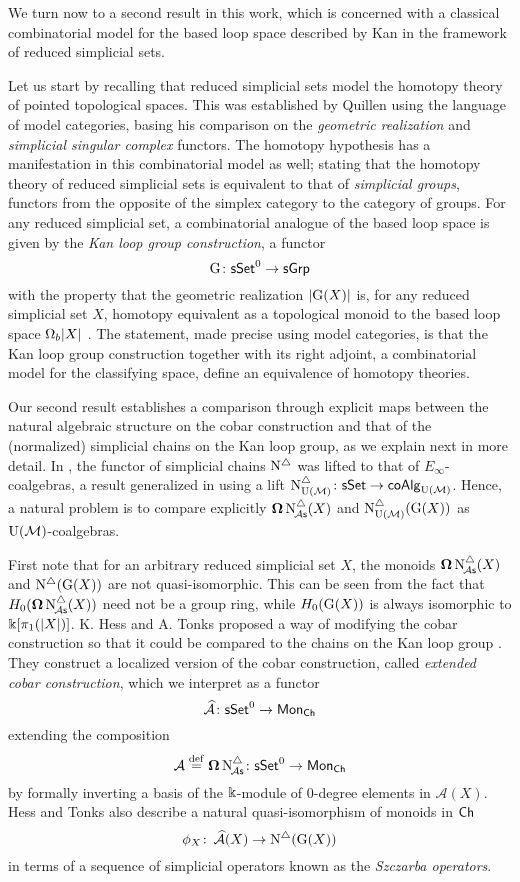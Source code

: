 We turn now to a second result in this work, which is concerned with a classical combinatorial model for the based loop space described by Kan in the framework of reduced simplicial sets.

Let us start by recalling that reduced simplicial sets model the homotopy theory of pointed topological spaces.
This was established by Quillen using the language of model categories, basing his comparison on the \textit{geometric realization} and \textit{simplicial singular complex} functors.
The homotopy hypothesis has a manifestation in this combinatorial model as well; stating that the homotopy theory of reduced simplicial sets is equivalent to that of \textit{simplicial groups}, functors from the opposite of the simplex category to the category of groups.
For any reduced simplicial set, a combinatorial analogue of the based loop space is given by the \textit{Kan loop group construction}, a functor
\[
\operatorname{G} \colon \mathsf{sSet}^0 \to \mathsf{sGrp}
\]
with the property that the geometric realization $\lvert\operatorname{G}(X)\rvert$ is, for any reduced simplicial set $X$, homotopy equivalent as a topological monoid to the based loop space $\Omega_b \lvert X\rvert$ \cite{berger1995loops}.
The statement, made precise using model categories, is that the Kan loop group construction together with its right adjoint, a combinatorial model for the classifying space, define an equivalence of homotopy theories.

Our second result establishes a comparison through explicit maps between the natural algebraic structure on the cobar construction and that of the (normalized) simplicial chains on the Kan loop group, as we explain next in more detail. In \cite{mcclure2003multivariable, berger2004combinatorial}, the functor of simplicial chains $\operatorname{N^{\triangle}}$ was lifted to that of $E_{\infty}$-coalgebras, a result generalized in \cite{medina2020prop1} using a lift $\operatorname{N^{\triangle}_{{\operatorname{U}(\mathcal{M})}}} \colon \mathsf{sSet} \to \mathsf{coAlg}_{{\operatorname{U}(\mathcal{M})}}$.
Hence, a natural problem is to compare explicitly $\operatorname{\mathbf{\Omega}} \operatorname{N^{\triangle}_{\!{\mathcal{A}\mathsf{s}}}}(X)$ and $\operatorname{N^{\triangle}_{{\operatorname{U}(\mathcal{M})}}}(\operatorname{G}(X))$ as ${\operatorname{U}(\mathcal{M})}$-coalgebras.

First note that for an arbitrary reduced simplicial set $X$, the monoids $\operatorname{\mathbf{\Omega}} \operatorname{N^{\triangle}_{\!{\mathcal{A}\mathsf{s}}}}(X)$ and $\operatorname{N^{\triangle}}(\operatorname{G}(X))$ are not quasi-isomorphic.
This can be seen from the fact that $H_0(\operatorname{\mathbf{\Omega}} \operatorname{N^{\triangle}_{\!{\mathcal{A}\mathsf{s}}}}(X))$ need not be a group ring, while $H_0(\operatorname{G}(X))$ is always isomorphic to $ \Bbbk[\pi_1(|X|)]$.
K. Hess and A. Tonks proposed a way of modifying the cobar construction so that it could be compared to the chains on the Kan loop group \cite{hess2010cobar}.
They construct a localized version of the cobar construction, called \textit{extended cobar construction}, which we interpret as a functor
\[
\operatorname{\mathcal{\widehat{A}}} \colon \mathsf{sSet}^0 \to \mathsf{Mon}_{\mathsf{Ch}}
\]
extending the composition
\[
\operatorname{\mathcal{A}} \stackrel{\mathrm{def}}{=} \operatorname{\mathbf{\Omega}} \operatorname{N^{\triangle}_{\!{\mathcal{A}\mathsf{s}}}} \colon \mathsf{sSet}^0 \to \mathsf{Mon}_{\mathsf{Ch}}
\]
by formally inverting a basis of the $\Bbbk$-module of $0$-degree elements in $\mathcal{A}(X)$.
Hess and Tonks also describe a natural quasi-isomorphism of monoids in $\mathsf{Ch}$
\[
\phi_X \colon \operatorname{\mathcal{\widehat{A}}}(X) \to \operatorname{N^{\triangle}}(\operatorname{G}(X))
\]
in terms of a sequence of simplicial operators known as the \textit{Szczarba operators}.

